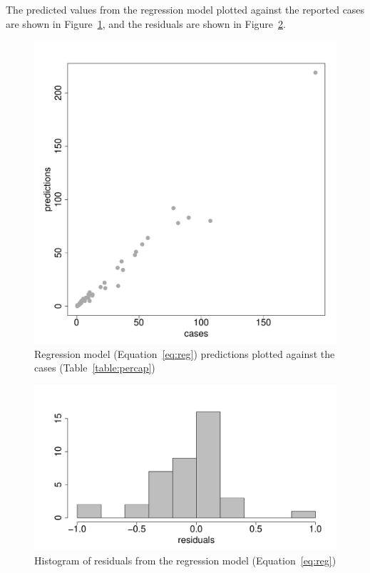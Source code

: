 \documentclass{article}
\begin{document}
\begin{itemize}
The predicted values from the regression model plotted against the reported cases are shown in Figure~\ref{fig:predict}, and the residuals are shown in Figure~\ref{fig:resid}.
\begin{figure}
\begin{center}
\includegraphics{draftfinalreport-015}
\end{center}
\caption{Regression model (Equation~\ref{eq:reg}) predictions plotted against the cases (Table~\ref{table:percap})}
\label{fig:predict}
\end{figure}


\begin{figure}
\begin{center}
\includegraphics{draftfinalreport-017}
\end{center}
\caption{Histogram of residuals from the regression model (Equation~\ref{eq:reg})}
\label{fig:resid}
\end{figure}


\end{itemize}
\end{document}
